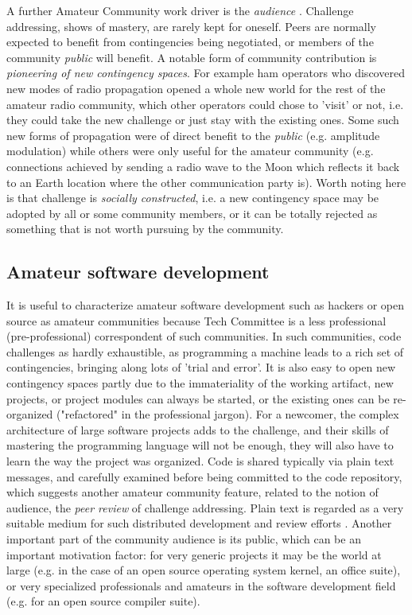 \documentclass{acm_proc_article-sp}
\begin{document}
A further Amateur Community work driver is the \textit{audience} \cite{bogdan03}. Challenge addressing, shows of mastery, are rarely kept for oneself. %
Peers are normally expected to benefit from contingencies being negotiated, or members of the community \textit{public} will benefit. A notable form of community contribution is \textit{pioneering of new contingency spaces}.  For example ham operators who discovered new modes of radio propagation opened a whole new world for the rest of the amateur radio community, which other operators could chose to 'visit' or not, i.e. they could take the new challenge or just stay with the existing ones. Some such new forms of propagation were of direct benefit to the \textit{public}  (e.g. amplitude modulation) while others were only useful for the amateur community (e.g. connections achieved by sending a radio wave to the Moon which reflects it back to an Earth location where the other communication party is). Worth noting here is that challenge is \textit{socially constructed}, i.e. a new contingency space may be adopted by all or some community members, or it can be totally rejected as something that is not worth pursuing by the community.

\subsection{Amateur software development}\label{sec:amateur_devel}
It is useful to characterize amateur software development such as hackers \cite{levy94} or open source \cite{kollock99} as amateur communities 
because Tech Committee is a less professional (pre-professional) correspondent of such communities. 
In such communities, code challenges as hardly exhaustible, as programming a machine leads to a rich set of contingencies, bringing along lots of 'trial and error'. 
It is also easy to open new contingency spaces partly due to the immateriality of the working artifact, new projects, or project modules can always be started, or the existing ones can be re-organized ("refactored" in the professional jargon). For a newcomer, the complex architecture of large software projects adds to the challenge, and their skills of mastering the programming language will not be enough, they will also have to learn the way the project was organized.
Code is shared typically via plain text messages, and carefully examined before being committed to the code repository, which suggests another amateur community feature, related to the notion of audience, the \textit{peer review} of challenge addressing. 
Plain text is regarded as a very suitable medium for such distributed development and review efforts \cite{yamauchi00}. 
Another important part of the community audience is its public, which can be an important motivation factor: for very generic projects it may be the world at large (e.g. in the case of an open source operating system kernel, an office suite), or very specialized professionals and amateurs in the software development field (e.g. for an open source compiler suite).
\end{document}
